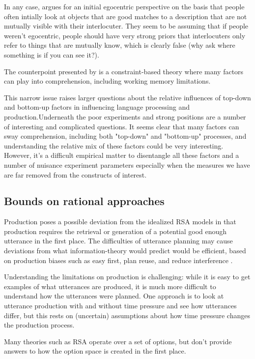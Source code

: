 \documentclass[]{article}
\begin{document}
In any case, \cite{keysar2000} argues for an initial egocentric perspective on the basis that people often intially look at objects that are good matches to a description that are not mutually visible with their interlocuter. They seem to be assuming that if people weren't egocentric, people should have very strong priors that interlocuters only refer to things that are mutually know, which is clearly false (why ask where something is if you can see it?). 

The counterpoint presented by \cite{hanna2003} is a constraint-based theory where many factors can play into comprehension, including working memory limitations. 

 This narrow issue raises larger questions about the relative influences of top-down and bottom-up factors in influencing language processing and production.Underneath the poor experiments and strong positions are a number of interesting and complicated questions. It seems clear that many factors can sway comprehension, including both "top-down" and "bottom-up" processes, and understanding the relative mix of these factors could be very interesting. However, it's a difficult empirical matter to disentangle all these factors and a number of nuisance experiment parameters especially when the measures we have are far removed from the constructs of interest. 

\subsection{Bounds on rational approaches}
Production poses a possible deviation from the idealized RSA models in that production requires the retrieval or generation of a potential good enough utterance in the first place. The difficulties of utterance planning may cause deviations from what information-theory would predict would be efficient, based on production biases such as easy first, plan reuse, and reduce interference \cite{macdonald2013}. 

Understanding the limitations on production is challenging: while it is easy to get examples of what utterances are produced, it is much more difficult to understand how the utterances were planned. One approach is to look at utterance production with and without time pressure and see how utterances differ, but this rests on (uncertain) assumptions about how time pressure changes the production process. 

Many theories such as RSA operate over a set of options, but don't provide answers to how the option space is created in the first place. 
\end{document}
